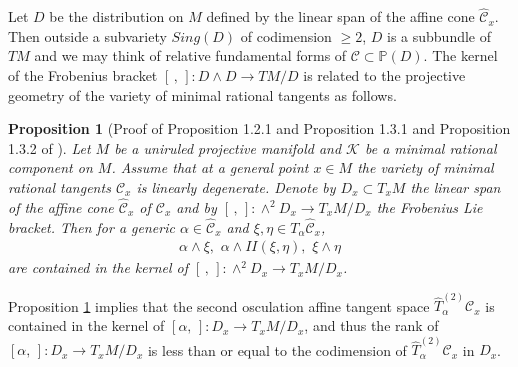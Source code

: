 \documentclass[12pt]{amsart}
\theoremstyle{plain}
\newtheorem{proposition}[theorem]{Proposition}
\theoremstyle{definition}
\begin{document}
Let $D$ be the distribution on $M$ defined by the linear span of the affine cone $\widehat{\mathcal C}_x$.  Then outside a subvariety $Sing(D)$ of codimension $\geq 2$, $D$ is a subbundle of $TM$ and we may think of relative fundamental forms of $\mathcal C \subset \mathbb P(D)$.
   The kernel of the Frobenius bracket $[\,,\,]: D \wedge  D \rightarrow TM/D$
   is related to the projective geometry of the variety of minimal rational tangents as follows.
\begin{proposition} [Proof of Proposition 1.2.1 and  Proposition 1.3.1 and Proposition 1.3.2 of \cite{HM99}] \label{kernel of frobenius braket}
 Let $M$ be a uniruled projective manifold and $\mathcal K$ be a minimal rational component on $M$. Assume that at a general point $x \in M$ the variety of minimal rational tangents $\mathcal C_x$ is linearly degenerate. Denote by $D_x \subset T_xM$ the linear span of the affine cone $\widehat{\mathcal C}_x$ of $\mathcal C_x$ and by  $[ \,,\,]: \wedge^2 D_x \rightarrow T_xM/D_x$ the Frobenius Lie bracket. Then
 for a generic $\alpha \in \widehat{\mathcal C}_x$ and $\xi , \eta \in T_{\alpha}\widehat{\mathcal C}_x$,
 \begin{eqnarray*}  \alpha \wedge \xi, \,\, \alpha \wedge II(\xi, \eta),\,\,\xi \wedge \eta
  \end{eqnarray*} are contained in the kernel of $[ \,,\,]: \wedge^2 D_x \rightarrow T_xM/D_x$.
 \end{proposition}

Proposition \ref{kernel of frobenius braket} implies that the second osculation affine tangent space $ \widehat  T^{(2)} _{\alpha}\mathcal C_x$ is contained in the kernel of $[\alpha, \,]: D_x \rightarrow T_xM/D_x$, and thus the rank of $[\alpha, \,]: D_x \rightarrow T_xM/D_x$ is less than or equal to the codimension of $ \widehat  T^{(2)} _{\alpha}\mathcal C_x$ in $D_x$.
\end{document}
